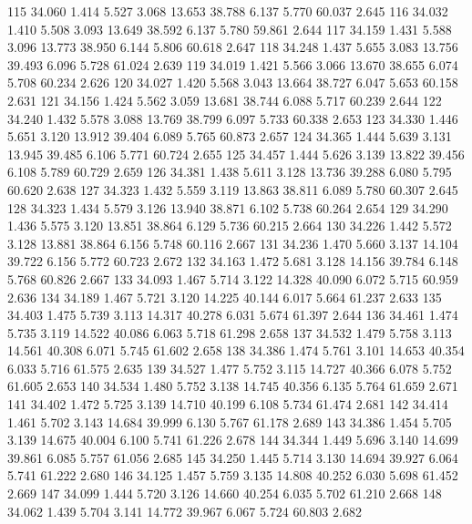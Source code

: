 \documentclass[a4paper,11pt]{scrartcl}
\begin{document}
\begin{Schunk}
\begin{Soutput}
115 34.060  1.414  5.527  3.068 13.653   38.788  6.137  5.770   60.037  2.645
116 34.032  1.410  5.508  3.093 13.649   38.592  6.137  5.780   59.861  2.644
117 34.159  1.431  5.588  3.096 13.773   38.950  6.144  5.806   60.618  2.647
118 34.248  1.437  5.655  3.083 13.756   39.493  6.096  5.728   61.024  2.639
119 34.019  1.421  5.566  3.066 13.670   38.655  6.074  5.708   60.234  2.626
120 34.027  1.420  5.568  3.043 13.664   38.727  6.047  5.653   60.158  2.631
121 34.156  1.424  5.562  3.059 13.681   38.744  6.088  5.717   60.239  2.644
122 34.240  1.432  5.578  3.088 13.769   38.799  6.097  5.733   60.338  2.653
123 34.330  1.446  5.651  3.120 13.912   39.404  6.089  5.765   60.873  2.657
124 34.365  1.444  5.639  3.131 13.945   39.485  6.106  5.771   60.724  2.655
125 34.457  1.444  5.626  3.139 13.822   39.456  6.108  5.789   60.729  2.659
126 34.381  1.438  5.611  3.128 13.736   39.288  6.080  5.795   60.620  2.638
127 34.323  1.432  5.559  3.119 13.863   38.811  6.089  5.780   60.307  2.645
128 34.323  1.434  5.579  3.126 13.940   38.871  6.102  5.738   60.264  2.654
129 34.290  1.436  5.575  3.120 13.851   38.864  6.129  5.736   60.215  2.664
130 34.226  1.442  5.572  3.128 13.881   38.864  6.156  5.748   60.116  2.667
131 34.236  1.470  5.660  3.137 14.104   39.722  6.156  5.772   60.723  2.672
132 34.163  1.472  5.681  3.128 14.156   39.784  6.148  5.768   60.826  2.667
133 34.093  1.467  5.714  3.122 14.328   40.090  6.072  5.715   60.959  2.636
134 34.189  1.467  5.721  3.120 14.225   40.144  6.017  5.664   61.237  2.633
135 34.403  1.475  5.739  3.113 14.317   40.278  6.031  5.674   61.397  2.644
136 34.461  1.474  5.735  3.119 14.522   40.086  6.063  5.718   61.298  2.658
137 34.532  1.479  5.758  3.113 14.561   40.308  6.071  5.745   61.602  2.658
138 34.386  1.474  5.761  3.101 14.653   40.354  6.033  5.716   61.575  2.635
139 34.527  1.477  5.752  3.115 14.727   40.366  6.078  5.752   61.605  2.653
140 34.534  1.480  5.752  3.138 14.745   40.356  6.135  5.764   61.659  2.671
141 34.402  1.472  5.725  3.139 14.710   40.199  6.108  5.734   61.474  2.681
142 34.414  1.461  5.702  3.143 14.684   39.999  6.130  5.767   61.178  2.689
143 34.386  1.454  5.705  3.139 14.675   40.004  6.100  5.741   61.226  2.678
144 34.344  1.449  5.696  3.140 14.699   39.861  6.085  5.757   61.056  2.685
145 34.250  1.445  5.714  3.130 14.694   39.927  6.064  5.741   61.222  2.680
146 34.125  1.457  5.759  3.135 14.808   40.252  6.030  5.698   61.452  2.669
147 34.099  1.444  5.720  3.126 14.660   40.254  6.035  5.702   61.210  2.668
148 34.062  1.439  5.704  3.141 14.772   39.967  6.067  5.724   60.803  2.682

\end{Soutput}
\end{Schunk}
\end{document}
